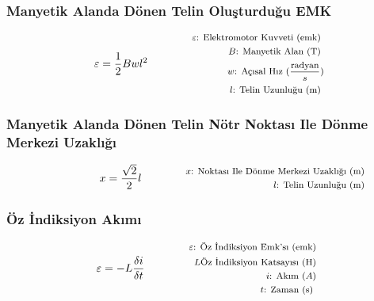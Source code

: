 \subsubsection*{Manyetik Alanda Dönen Telin Oluşturduğu EMK}
\begin{equation}
    \varepsilon = \frac{1}{2} Bwl^2 \qquad \qquad \parbox{4cm}{\footnotesize$\begin{aligned}
        \varepsilon\text{: Elektromotor Kuvveti (emk) } \\
        B\text{: Manyetik Alan (T) } \\
        w\text{: Açısal Hız } (\frac{\text{radyan}}{s}) \\
        l\text{: Telin Uzunluğu (m) }
\end{aligned}$}
\end{equation}

\subsubsection*{Manyetik Alanda Dönen Telin Nötr Noktası Ile Dönme Merkezi Uzaklığı}
\begin{equation}
    x = \frac{\sqrt{2}}{2} l \qquad \qquad \parbox{4cm}{\footnotesize$\begin{aligned}
        x\text{: Noktası Ile Dönme Merkezi Uzaklığı (m) } \\
        l\text{: Telin Uzunluğu (m) }
\end{aligned}$}
\end{equation}

\subsubsection*{Öz İndiksiyon Akımı}
\begin{equation}
    \varepsilon = -L \frac{\delta i}{ \delta t }\qquad \qquad \parbox{4cm}{\footnotesize$\begin{aligned}
        \varepsilon\text{: Öz İndiksiyon Emk'sı (emk)} \\
        L\text{Öz İndiksiyon Katsayısı (H)} \\
        i\text{: Akım } (A)  \\
        t\text{: Zaman (s) }
\end{aligned}$}
\end{equation}
